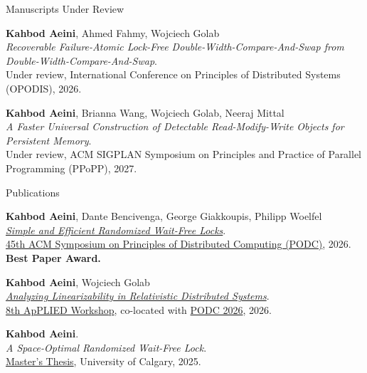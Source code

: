 \documentclass{resume} %
\begin{document}
\begin{rSection}{Manuscripts Under Review}

{\bf Kahbod Aeini}, Ahmed Fahmy, Wojciech Golab \\
\textit{Recoverable Failure-Atomic Lock-Free Double-Width-Compare-And-Swap from Double-Width-Compare-And-Swap}. \\
Under review, International Conference on Principles of Distributed Systems (OPODIS), 2026.

{\bf Kahbod Aeini}, Brianna Wang, Wojciech Golab, Neeraj Mittal \\
\textit{A Faster Universal Construction of Detectable Read-Modify-Write Objects for Persistent Memory}. \\
Under review, ACM SIGPLAN Symposium on Principles and Practice of Parallel Programming (PPoPP), 2027.
\end{rSection}


\begin{rSection}{Publications}

{\bf Kahbod Aeini}, Dante Bencivenga, George Giakkoupis, Philipp Woelfel \\
\textit{\href{https://dl.acm.org/doi/10.1145/3796701.3815952}{Simple and Efficient Randomized Wait-Free Locks}}. \\
\href{https://www.podc.org/podc2026/}{45th ACM Symposium on Principles of Distributed Computing (PODC)}, 2026. {\bf Best Paper Award.}

{\bf Kahbod Aeini}, Wojciech Golab \\
\textit{\href{https://dl.acm.org/doi/10.1145/3820355.3820388}{Analyzing Linearizability in Relativistic Distributed Systems}}. \\
\href{https://www.cse.chalmers.se/~elad/ApPLIED2026/index.html}{8th ApPLIED Workshop}, co-located with \href{https://www.podc.org/podc2026/}{PODC 2026}, 2026.

{\bf Kahbod Aeini}. \\
\textit{A Space-Optimal Randomized Wait-Free Lock}. \\
\href{https://ucalgary.scholaris.ca/bitstreams/5ae5cf8f-5009-4db3-b91e-d3dbb679b5bf/download}{Master's Thesis}, University of Calgary, 2025.
\end{rSection}


\end{document}

